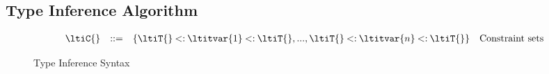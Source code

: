 %


\subsection{Type Inference Algorithm}

\begin{figure}
$$
\begin{array}{lrll}
  \ltiC{} &::=& {\ltiCSet{\ltiCEntry{\ltiT{}}{\ltitvar{1}}{\ltiT{}},...,\ltiCEntry{\ltiT{}}{\ltitvar{n}}{\ltiT{}}}}
                      &\mbox{Constraint sets} \\
\end{array}
$$
\caption{Type Inference Syntax}
\end{figure}


